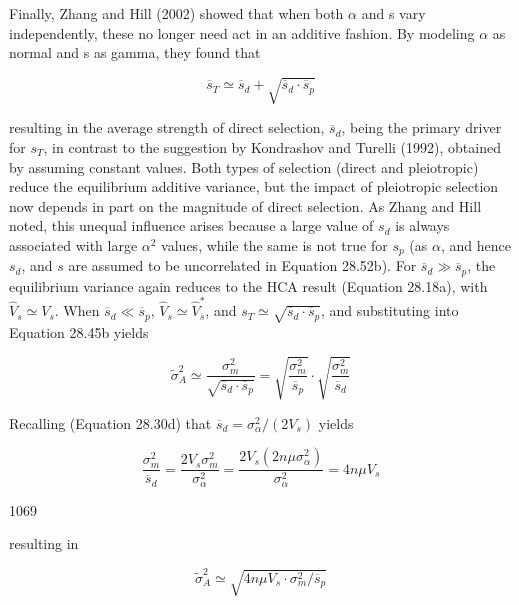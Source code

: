\documentclass{article}
\begin{document}
Finally, Zhang and Hill (2002) showed that when both  $ \alpha $ and s vary independently, these no longer need act in an additive fashion. By modeling  $ \alpha $ as normal and s as gamma, they found that

\begin{equation}
\overline{s}_{T}\simeq\overline{s}_{d}+\sqrt{\overline{s}_{d}\cdot\overline{s}_{p}}
\tag{28.52b}
\label{eq:28_52b}
\end{equation}

resulting in the average strength of direct selection,  $ \overline{s}_d $, being the primary driver for  $ s_T $, in contrast to the suggestion by Kondrashov and Turelli (1992), obtained by assuming constant values. Both types of selection (direct and pleiotropic) reduce the equilibrium additive variance, but the impact of pleiotropic selection now depends in part on the magnitude of direct selection. As Zhang and Hill noted, this unequal influence arises because a large value of  $ s_d $ is always associated with large  $ \alpha^2 $ values, while the same is not true for  $ s_p $ (as  $ \alpha $, and hence  $ s_d $, and  $ s $ are assumed to be uncorrelated in Equation 28.52b). For  $ \overline{s}_d \gg \overline{s}_p $, the equilibrium variance again reduces to the HCA result (Equation 28.18a), with  $ \widehat{V}_s \simeq V_s $. When  $ \overline{s}_d \ll \overline{s}_p $,  $ \widehat{V}_s \simeq \widehat{V}_s^* $, and  $ s_T \simeq \sqrt{\overline{s}_d \cdot \overline{s}_p} $, and substituting into Equation 28.45b yields

\begin{equation}
\widetilde{\sigma}_{A}^{2}\simeq\frac{\sigma_{m}^{2}}{\sqrt{\overline{s}_{d}\cdot\overline{s}_{p}}}=\sqrt{\frac{\sigma_{m}^{2}}{\overline{s}_{p}}}\cdot\sqrt{\frac{\sigma_{m}^{2}}{\overline{s}_{d}}}
\tag{28.52c}
\label{eq:28_52c}
\end{equation}

Recalling (Equation 28.30d) that  $ \overline{s}_{d} = \sigma_{\alpha}^{2}/(2V_{s}) $ yields

\begin{equation}
\frac{\sigma_{m}^{2}}{\overline{s}_{d}}=\frac{2V_{s}\sigma_{m}^{2}}{\sigma_{\alpha}^{2}}=\frac{2V_{s}(2n\mu\sigma_{\alpha}^{2})}{\sigma_{\alpha}^{2}}=4n\mu V_{s}
\end{equation}

1069

resulting in

\begin{equation}
\widetilde{\sigma}_{A}^{2}\simeq\sqrt{4n\mu V_{s}\cdot\sigma_{m}^{2}/\overline{{s}}_{p}}
\tag{28.52d}
\label{eq:28_52d}
\end{equation}
\end{document}
